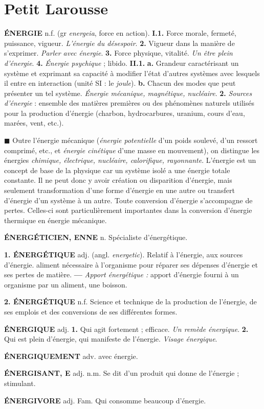 \section{Petit Larousse}

{\bf ÉNERGIE} {\sf n.f.} (gr {\it energeia}, force en action). {\bf I.1.} Force morale, fermeté, puissance, vigueur. {\it L'énergie du désespoir}. {\bf 2.} Vigueur dans la manière de s'exprimer. {\it Parler avec énergie}. {\bf 3.} Force physique, vitalité. {\it Un être plein d'énergie}. {\bf 4.}  {\it Énergie psychique} ; libido. {\bf II.1.}  {\bf a.} Grandeur caractérisant un système et exprimant sa capacité à modifier l'état d'autres systèmes avec lesquels il entre en interaction (unité SI : le {\it joule}). {\bf b.} Chacun des modes que peut présenter un tel système. {\it Énergie mécanique, magnétique, nucléaire}. {\bf 2.} {\it Sources d'énergie} : ensemble des matières premières ou des phénomènes naturels utilisés pour la production d'énergie (charbon, hydrocarbures, uranium, cours d'eau, marées, vent, etc.).

$\blacksquare$ Outre l'énergie mécanique ({\it énergie potentielle} d'un poids soulevé, d'un ressort comprimé, etc., et {\it énergie cinétique} d'une masse en mouvement), on distingue les énergies {\it chimique, électrique, nucléaire, calorifique, rayonnante}. L'énergie est un concept de base de la physique car un système isolé a une énergie totale constante. Il ne peut donc y avoir création ou disparition d'énergie, mais seulement transformation d'une forme d'énergie en une autre ou transfert d'énergie d'un système à un autre. Toute conversion d'énergie s'accompagne de pertes. Celles-ci sont particulièrement importantes dans la conversion d'énergie thermique en énergie mécanique.

\vspace{0.24cm}
{\footnotesize 
{\bf ÉNERGÉTICIEN, ENNE} {\sf n.} Spécialiste d'énergétique.

{\bf 1. ÉNERGÉTIQUE} {\sf adj.} (angl. {\it energetic}). Relatif à l'énergie, aux sources d'énergie.  aliment nécessaire à l'organisme pour réparer ses dépenses d'énergie et ses pertes de matière. {\bf —} {\it Apport énergétique :} apport d'énergie fourni à un organisme par un aliment, une boisson.

{\bf 2. ÉNERGÉTIQUE} {\sf n.f.} Science et technique de la production de l'énergie, de ses emplois et des conversions de ses différentes formes.

{\bf ÉNERGIQUE} {\sf adj.} {\bf 1.} Qui agit fortement ; efficace. {\it Un remède énergique}. {\bf 2.} Qui est plein d'énergie, qui manifeste de l'énergie. {\it Visage énergique}.

{\bf ÉNERGIQUEMENT} {\sf adv.} avec énergie.

{\bf ÉNERGISANT, E} {\sf adj. n.m.} Se dit d'un produit qui donne de l'énergie ; stimulant.

{\bf ÉNERGIVORE} {\sf adj. Fam.} Qui consomme beaucoup d'énergie.}
\vspace{0.31cm}

